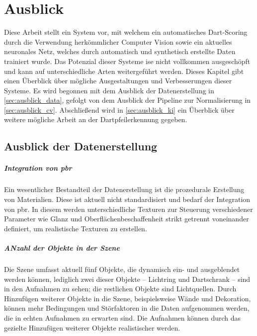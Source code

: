 
\chapter{Ausblick}
\label{cha:ausblick}

Diese Arbeit stellt ein System vor, mit welchem ein automatisches Dart-Scoring durch die Verwendung herkömmlicher Computer Vision sowie ein aktuelles neuronales Netz, welches durch automatisch und synthetisch erstellte Daten trainiert wurde. Das Potenzial dieser Systeme ise nicht vollkommen ausgeschöpft und kann auf unterschiedliche Arten weitergeführt werden. Dieses Kapitel gibt einen Überblick über mögliche Ausgestaltungen und Verbesserungen dieser Systeme. Es wird begonnen mit dem Ausblick der Datenerstellung in \autoref{sec:ausblick_data}, gefolgt von dem Ausblick der Pipeline zur Normalisierung in \autoref{sec:ausblick_cv}. Abschließend wird in \autoref{sec:ausblick_ki} ein Überblick über weitere mögliche Arbeit an der Dartpfeilerkennung gegeben.


\section{Ausblick der Datenerstellung}
\label{sec:ausblick_data}

\paragraph{Integration von \ac{pbr}}

Ein wesentlicher Bestandteil der Datenerstellung ist die prozedurale Erstellung von Materialien. Diese ist aktuell nicht standardisiert und bedarf der Integration von \ac{pbr}. In diesem werden unterschiedliche Texturen zur Steuerung verschiedener Parameter wie Glanz und Oberflächenbeschaffenheit strikt getrennt voneinander definiert, um realistische Texturen zu erstellen.


\paragraph{ANzahl der Objekte in der Szene}

Die Szene umfasst aktuell fünf Objekte, die dynamisch ein- und ausgeblendet werden können, lediglich zwei dieser Objekte -- Lichtring und Dartschrank -- sind in den Aufnahmen zu sehen; die restlichen Objekte sind Lichtquellen. Durch Hinzufügen weiterer Objekte in die Szene, beispielsweise Wände und Dekoration, können mehr Bedingungen und Störfaktoren in die Daten aufgenommen werden, die in echten Aufnahmen zu erwarten sind. Die Aufnahmen können durch das gezielte Hinzufügen weiterer Objekte realistischer werden.

